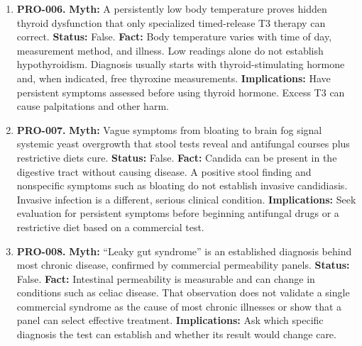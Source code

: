 \documentclass[11pt,oneside]{book}
\begin{document}
\begin{enumerate}[leftmargin=0pt,labelwidth=0pt,labelsep=0pt,itemindent=0pt]
\item[] \textbf{PRO-006.} \textbf{Myth:} A persistently low body temperature proves hidden thyroid dysfunction that only specialized timed-release T3 therapy can correct.\newline
\textbf{Status:} False.\newline
\textbf{Fact:} Body temperature varies with time of day, measurement method, and illness. Low readings alone do not establish hypothyroidism. Diagnosis usually starts with thyroid-stimulating hormone and, when indicated, free thyroxine measurements. \cite{ref157}\newline
\textbf{Implications:} Have persistent symptoms assessed before using thyroid hormone. Excess T3 can cause palpitations and other harm.
\item[] \textbf{PRO-007.} \textbf{Myth:} Vague symptoms from bloating to brain fog signal systemic yeast overgrowth that stool tests reveal and antifungal courses plus restrictive diets cure.\newline
\textbf{Status:} False.\newline
\textbf{Fact:} Candida can be present in the digestive tract without causing disease. A positive stool finding and nonspecific symptoms such as bloating do not establish invasive candidiasis. Invasive infection is a different, serious clinical condition. \cite{ref158,ref490}\newline
\textbf{Implications:} Seek evaluation for persistent symptoms before beginning antifungal drugs or a restrictive diet based on a commercial test.
\item[] \textbf{PRO-008.} \textbf{Myth:} ``Leaky gut syndrome'' is an established diagnosis behind most chronic disease, confirmed by commercial permeability panels.\newline
\textbf{Status:} False.\newline
\textbf{Fact:} Intestinal permeability is measurable and can change in conditions such as celiac disease. That observation does not validate a single commercial syndrome as the cause of most chronic illnesses or show that a panel can select effective treatment. \cite{ref159}\newline
\textbf{Implications:} Ask which specific diagnosis the test can establish and whether its result would change care.
\end{enumerate}
\end{document}
